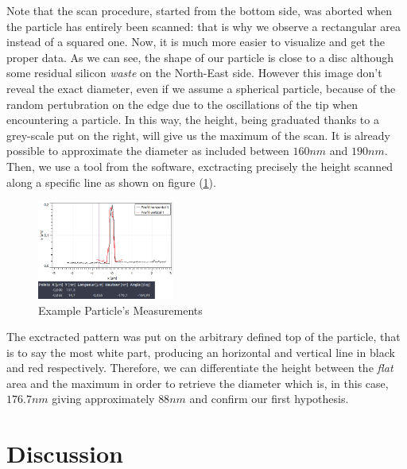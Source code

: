 \documentclass{article}
\numberwithin{equation}{section}
\begin{document}
Note that the scan procedure, started from the bottom side, was aborted when the particle has entirely been scanned: that is why we observe a rectangular area instead of a squared one. Now, it is much more easier to visualize and get the proper data. As we can see, the shape of our particle is close to a disc although some residual silicon \textit{waste} on the North-East side. However this image don't reveal the exact diameter, even if we assume a spherical particle, because of the random pertubration on the edge due to the oscillations of the tip when encountering a particle. In this way, the height, being graduated thanks to a grey-scale put on the right, will give us the maximum of the scan. It is already possible to approximate the diameter as included between $160 nm$ and $190 nm$. Then, we use a tool from the software, exctracting precisely the height scanned along a specific line as shown on figure (\ref{fig:gwyddion_mesure_ex}).
\begin{figure}[h]
    \centering
    \includegraphics[width=0.4\textwidth, height=0.32\textwidth]{gwyddion_mesure_ex.png}
    \caption{Example Particle's Measurements}
    \label{fig:gwyddion_mesure_ex}
\end{figure}
The exctracted pattern was put on the arbitrary defined top of the particle, that is to say the most white part, producing an horizontal and vertical line in black and red respectively. Therefore, we can differentiate the height between the \textit{flat} area and the maximum in order to retrieve the diameter which is, in this case, $176.7 nm$ giving approximately $88 nm$ and confirm our first hypothesis.

\section{Discussion}
\end{document}
